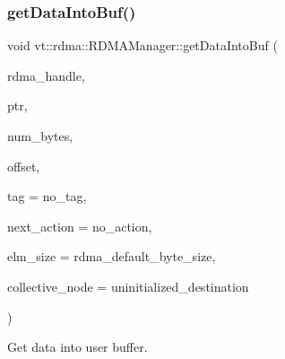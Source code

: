 \subsubsection{\texorpdfstring{get\+Data\+Into\+Buf()}{getDataIntoBuf()}}
{\footnotesize\ttfamily void vt\+::rdma\+::\+R\+D\+M\+A\+Manager\+::get\+Data\+Into\+Buf (\begin{DoxyParamCaption}\item[{\hyperlink{namespacevt_a10442579ec4e7ebef223818e64bcf908}{R\+D\+M\+A\+\_\+\+Handle\+Type} const \&}]{rdma\+\_\+handle,  }\item[{\hyperlink{namespacevt_a9e2c953286c7616f7c218e9951790776}{R\+D\+M\+A\+\_\+\+Ptr\+Type} const \&}]{ptr,  }\item[{\hyperlink{namespacevt_aab8d55968084610ce3b17057981e9300}{Byte\+Type} const \&}]{num\+\_\+bytes,  }\item[{\hyperlink{namespacevt_aab8d55968084610ce3b17057981e9300}{Byte\+Type} const \&}]{offset,  }\item[{\hyperlink{namespacevt_a84ab281dae04a52a4b243d6bf62d0e52}{Tag\+Type} const \&}]{tag = {\ttfamily no\+\_\+tag},  }\item[{\hyperlink{namespacevt_ae0a5a7b18cc99d7b732cb4d44f46b0f3}{Action\+Type}}]{next\+\_\+action = {\ttfamily no\+\_\+action},  }\item[{\hyperlink{namespacevt_aab8d55968084610ce3b17057981e9300}{Byte\+Type} const \&}]{elm\+\_\+size = {\ttfamily rdma\+\_\+default\+\_\+byte\+\_\+size},  }\item[{\hyperlink{namespacevt_a866da9d0efc19c0a1ce79e9e492f47e2}{Node\+Type} const \&}]{collective\+\_\+node = {\ttfamily uninitialized\+\_\+destination} }\end{DoxyParamCaption})}



Get data into user buffer. 


